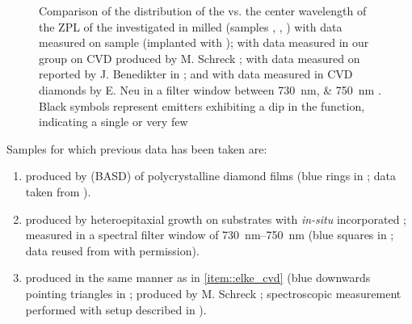 	\begin{figure}[!htb]
		\centering
		\caption[Comparison of \siv \lws with available data sources]{Comparison of the distribution of the \lw vs. the center wavelength of the ZPL of the investigated \sivs in milled \nds (samples \insituF, \insituS, \insituH) with data measured on sample \implantedTao (implanted with \Si); with data measured in our group on CVD \nds produced by M. Schreck \cite{Neu2011b}; with data measured on \nds reported by J. Benedikter in \cite{Benedikter2017a}; and with data measured in CVD diamonds by E. Neu in a filter window between \SIlist{730; 750}{nm} \cite{Neu2012}. Black symbols represent emitters exhibiting a dip in the \gtz function, indicating a single or very few \sivs}
		\label{fig::bimodal_distr_compare}
	\end{figure}


	Samples for which previous data has been taken are:
	\begin{enumerate}
		\item \nds produced by \basd (BASD) of polycrystalline \CVD diamond films (blue rings in  \cite{Neu2011a}; data taken from \cite{Benedikter2017a}).
		\item \label{item::elke_cvd}\nds produced by heteroepitaxial \CVD growth on \ir substrates with \textit{in-situ} incorporated \sivs; measured in a spectral filter window of \SIrange{730}{750}{nm} (blue squares in ; data reused from \cite{Neu2012} with permission).
		\item \nds produced in the same manner as in \ref{item::elke_cvd} (blue downwards pointing triangles in ; produced by M. Schreck \cite{Neu2011b}; spectroscopic measurement performed with setup described in ).
	\end{enumerate}
	
